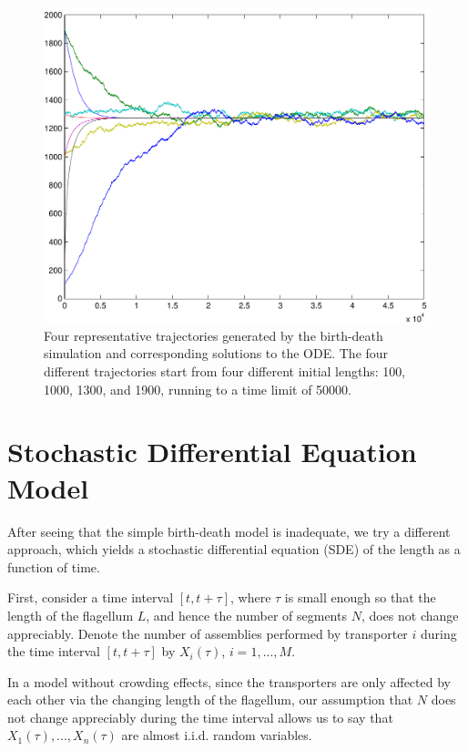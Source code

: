 \documentclass[titlepage]{article}
\begin{document}
\begin{figure}%
\centering
\includegraphics[width=\textwidth]{BirthDeathTrajs}
\caption{
Four representative trajectories generated by the birth-death simulation and corresponding solutions to the ODE.
The four different trajectories start from four different initial lengths: 100, 1000, 1300, and 1900, running to a time limit of 50000.
}
\label{fig:bdTrajs}
\end{figure}

\section{Stochastic Differential Equation Model}

After seeing that the simple birth-death model is inadequate, we try a different approach, which yields a stochastic differential equation (SDE) of the length as a function of time.

First, consider a time interval $[t,t+\tau]$, where $\tau$ is small enough so that the length of the flagellum $L$, and hence the number of segments $N$, does not change appreciably.
Denote the number of assemblies performed by transporter $i$ during the time interval $[t,t+\tau]$ by $X_i(\tau)$, $i=1,...,M$.

In a model without crowding effects, since the transporters are only affected by each other via the changing length of the flagellum, our assumption that $N$ does not change appreciably during the time interval allows us to say that $X_1(\tau),...,X_n(\tau)$ are almost i.i.d. random variables.
\end{document}
